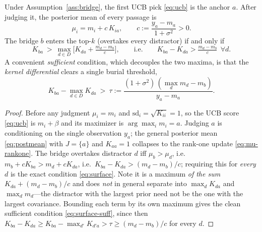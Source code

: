 \documentclass[11pt]{article}
\theoremstyle{plain}
\theoremstyle{definition}
\theoremstyle{remark}
\begin{document}
\begin{lemma}[Surfacing]\label{lem:surface}
Under Assumption~\ref{ass:bridge}, the first UCB pick \eqref{eq:ucb} is the anchor $a$. After judging it, the
posterior mean of every passage is
\begin{equation}
\mu_i=m_i+c\,K_{ia},\qquad c:=\frac{y_a-m_a}{1+\sigma^2}>0.
\label{eq:mu-rankone}
\end{equation}
The bridge $b$ enters the top-$k$ (overtakes every distractor) if and only if
\begin{equation}
K_{ba}\ >\ \max_{d\in D}\Big[K_{da}+\tfrac{m_d-m_b}{c}\Big],
\qquad\text{i.e.}\qquad K_{ba}-K_{da}>\tfrac{m_d-m_b}{c}\ \ \forall d.
\label{eq:surface}
\end{equation}
A convenient \emph{sufficient} condition, which decouples the two maxima, is that the \emph{kernel differential}
clears a single burial threshold,
\begin{equation}
K_{ba}-\max_{d\in D}K_{da}\ >\ \tau:=\frac{(1+\sigma^2)\,(\max_{d}m_d-m_b)}{y_a-m_a}.
\label{eq:surface-suff}
\end{equation}
\end{lemma}

\begin{proof}
Before any judgment $\mu_i=m_i$ and $\mathrm{sd}_i=\sqrt{K_{ii}}=1$, so the UCB score \eqref{eq:ucb} is $m_i+\beta$
and its maximizer is $\arg\max_i m_i = a$. Judging $a$ is conditioning on the single observation $y_a$; the general
posterior mean \eqref{eq:postmean} with $J=\{a\}$ and $K_{aa}=1$ collapses to the rank-one update
\eqref{eq:mu-rankone}. The bridge overtakes distractor $d$ iff $\mu_b>\mu_d$, i.e.\ $m_b+cK_{ba}>m_d+cK_{da}$, i.e.\
$K_{ba}-K_{da}>(m_d-m_b)/c$; requiring this for \emph{every} $d$ is the exact condition \eqref{eq:surface}. Note it
is a maximum \emph{of the sum} $K_{da}+(m_d-m_b)/c$ and does \emph{not} in general separate into $\max_d K_{da}$ and
$\max_d m_d$---the distractor with the largest prior need not be the one with the largest covariance. Bounding each
term by its own maximum gives the clean sufficient condition \eqref{eq:surface-suff}, since then
$K_{ba}-K_{da}\ge K_{ba}-\max_{d'}K_{d'a}>\tau\ge(m_d-m_b)/c$ for every $d$.
\end{proof}
\end{document}
